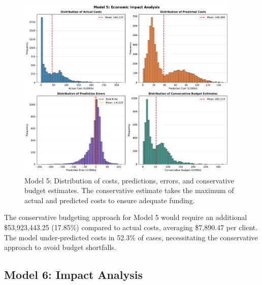 \begin{figure}[htbp]
\centering
\includegraphics[width=0.95\textwidth]{figures/model_5_Impact_Histograms.pdf}
\caption{Model 5: Distribution of costs, predictions, errors, and conservative budget estimates. The conservative estimate takes the maximum of actual and predicted costs to ensure adequate funding.}
\label{fig:model5_impact_histograms}
\end{figure}

The conservative budgeting approach for Model 5 would require an additional \$53,923,443.25 (17.85\%) compared to actual costs, averaging \$7,890.47 per client. The model under-predicted costs in 52.3\% of cases, necessitating the conservative approach to avoid budget shortfalls.

\clearpage

\subsection{Model 6: Impact Analysis}
\label{subsec:model6_impact}

